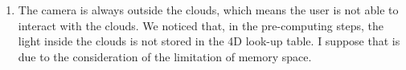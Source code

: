 \begin{enumerate}
\item The camera is always outside the clouds, which means the user is not able to interact with the clouds. We noticed that, in the pre-computing steps, the light inside the clouds is not stored in the 4D look-up table. I suppose that is due to the consideration of the limitation of memory space.
\end{enumerate}
